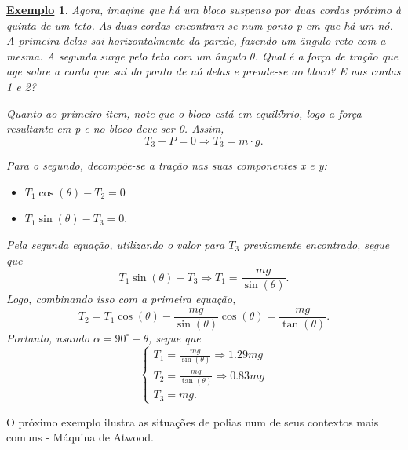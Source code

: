 \documentclass{article}
\newtheorem{example}{\underline{Exemplo}}
\begin{document}
\begin{example}
    Agora, imagine que h\'a um bloco suspenso por duas cordas pr\'oximo \`a quinta de um teto. As duas cordas encontram-se num
  ponto p em que h\'a um n\'o. A primeira delas sai horizontalmente da parede, fazendo um \^angulo reto com a mesma. A segunda
  surge pelo teto com um \^angulo $\theta .$ Qual \'e a for\c ca de tra\c c\~ao que age sobre a corda que sai do ponto de n\'o
  delas e prende-se ao bloco? E nas cordas 1 e 2?

  Quanto ao primeiro item, note que o bloco est\'a em equil\'ibrio, logo a for\c ca resultante em p e no bloco deve ser 0.
  Assim, 
    $$
      T_{3}-P = 0 \Rightarrow  T_{3} = m \cdot g.
    $$

  Para o segundo, decomp\~oe-se a tra\c c\~ao nas suas componentes x e y:
 \begin{itemize}
   \item[Em x:] $T_{1}\cos{(\theta )}-T_{2}=0$
   \item[Em y:] $T_{1}\sin{(\theta )}-T_{3}=0.$
 \end{itemize}
 Pela segunda equação, utilizando o valor para $T_{3}$ previamente encontrado, segue que 
   $$
      T_{1}\sin{(\theta )} - T_{3}\Rightarrow T_{1}=\frac{mg}{\sin{(\theta )}}.
   $$
   Logo, combinando isso com a primeira equação, 
     $$
       T_{2}=T_{1}\cos{(\theta )} - \frac{mg}{\sin{(\theta )}}\cos{(\theta )} = \frac{mg}{\tan{(\theta )}}.
     $$
  Portanto, usando $\alpha =90^{\circ} - \theta $, segue que 
    $$
       \left\{\begin{array}{ll}
          T_{1}=\frac{mg}{\sin{(\theta )}} \Rightarrow 1.29mg\\
          T_{2}=\frac{mg}{\tan{(\theta )}} \Rightarrow 0.83mg\\
          T_{3}=mg.
        \end{array}\right.
    $$
\end{example}
  O próximo exemplo ilustra as situações de polias num de seus contextos mais comuns - Máquina de Atwood.
\end{document}
